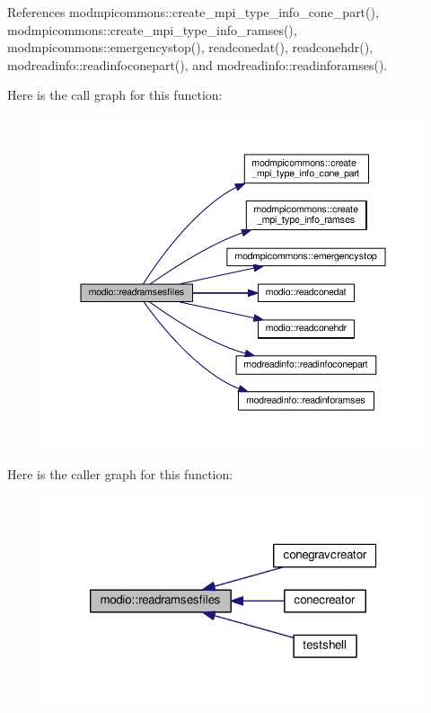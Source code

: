 References modmpicommons\-::create\-\_\-mpi\-\_\-type\-\_\-info\-\_\-cone\-\_\-part(), modmpicommons\-::create\-\_\-mpi\-\_\-type\-\_\-info\-\_\-ramses(), modmpicommons\-::emergencystop(), readconedat(), readconehdr(), modreadinfo\-::readinfoconepart(), and modreadinfo\-::readinforamses().



Here is the call graph for this function\-:
\nopagebreak
\begin{figure}[H]
\begin{center}
\leavevmode
\includegraphics[width=350pt]{classmodio_a65b2a30853dd9ec7641c578cb220a3fe_cgraph}
\end{center}
\end{figure}




Here is the caller graph for this function\-:\nopagebreak
\begin{figure}[H]
\begin{center}
\leavevmode
\includegraphics[width=320pt]{classmodio_a65b2a30853dd9ec7641c578cb220a3fe_icgraph}
\end{center}
\end{figure}


